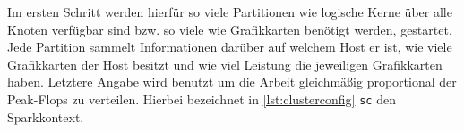 %
%
%
%

Im ersten Schritt werden hierfür so viele Partitionen wie logische Kerne über alle Knoten verfügbar sind bzw. so viele wie Grafikkarten benötigt werden, gestartet.
Jede Partition sammelt Informationen darüber auf welchem Host er ist, wie viele Grafikkarten der Host besitzt und wie viel Leistung die jeweiligen Grafikkarten haben.
Letztere Angabe wird benutzt um die Arbeit gleichmäßig proportional der Peak-Flops zu verteilen.
Hierbei bezeichnet in \autoref{lst:clusterconfig} \lstinline!sc! den Sparkkontext.

